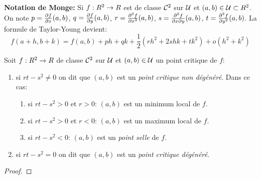 {\bf\sffamily Notation de Monge:} Si $f:R^2 \to R$ est de classe $\mathcal{C}^2$ sur $\mathcal{U}$ et $(a,b) \in \mathcal{U} \subset R^2$. On note $p=\frac{\partial f}{\partial x}(a,b)$, $q=\frac{\partial f}{\partial y}(a,b)$, $r=\frac{\partial^2 f}{\partial x^2}(a,b)$, $s=\frac{\partial^2 f}{\partial x\partial y}(a,b)$, $t=\frac{\partial^2 f}{\partial y^2}(a,b)$. La formule de Taylor-Young devient:
\[
f(a+h,b+k) = f(a,b) + ph +qk +\frac 1 2 \left( rh^2 + 2shk+tk^2 \right) + o(h^2 + k^2)
\]

\begin{defprop}
	Soit $f:R^2 \to R$ de classe $\mathcal{C}^2$ sur $\mathcal{U}$ et $(a,b) \in \mathcal{U}$ un point critique de $f$:
	\begin{enumerate}
		\item si $rt - s^2 \neq 0 $ on dit que $(a,b)$ est un \emph{point critique non dégénéré}. Dans ce cas:
			\begin{enumerate}
				\item si $ rt -s^2 > 0$ et $r>0$:  $(a,b)$ est un minimum  local de $f$.
				\item si $ rt -s^2 > 0$ et $r<0$:  $(a,b)$ est un maximum local de $f$.
				\item si $ rt -s^2 < 0$: $(a,b)$ est un \emph{point selle} de $f$.
			\end{enumerate}
		\item si $ rt -s^2 = 0 $ on dit que $(a,b)$ est un \emph{point critique dégénéré}.
	\end{enumerate}
\end{defprop}

\begin{proof}
	\pl{\rep{6cm}}
\end{proof}

